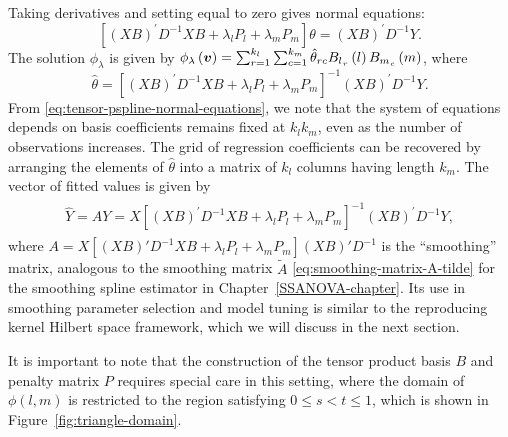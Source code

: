 \noindent
Taking derivatives and setting equal to zero gives normal equations:
\begin{equation} \label{eq:tensor-pspline-normal-equations}
\left[ \left(XB\right)^\prime D^{-1} XB +  \lambda_l P_l+ \lambda_m P_m\right]\theta = \left(X B\right)^\prime D^{-1}Y.
\end{equation}
\noindent
The solution $\phi_\lambda$ is given by $\phi_\lambda\left(\mbox{\boldmath $v$}\right) = \sum_{r=1}^{k_l} \sum_{c=1}^{k_m} \hat{\theta}_{rc} {B_l}_{_{r}}\left(l\right){B_m}_{_{c}}\left(m\right)$, where
\begin{equation} 
\hat{\theta} = \left[ \left(XB\right)^\prime D^{-1} XB +  \lambda_l P_l+ \lambda_m P_m\right]^{-1} \left(X B\right)^\prime D^{-1}Y.
\end{equation}
\noindent
From \eqref{eq:tensor-pspline-normal-equations}, we note that the system of equations depends on basis coefficients remains fixed at $k_l k_m$, even as the number of observations increases. The grid of regression coefficients can be recovered by arranging the elements of $\hat{\theta}$ into a matrix of $k_l$ columns having length $k_m$. The vector of fitted values is given by 
\begin{align}
\begin{split} \label{eq:pspline-smoothing-matrix}
\hat{Y} = AY  = X \left[ \left(XB\right)^\prime D^{-1} XB +  \lambda_l P_l+ \lambda_m P_m\right]^{-1} \left(X B\right)^\prime D^{-1}Y,
\end{split}
\end{align}
\noindent
where $A = X \left[ \left(XB\right)' D^{-1} XB +  \lambda_l P_l+ \lambda_m P_m\right] \left(X B\right)' D^{-1}$ is the ``smoothing'' matrix, analogous to the smoothing matrix $\tilde{A}$ \eqref{eq:smoothing-matrix-A-tilde} for the smoothing spline estimator in Chapter~\ref{SSANOVA-chapter}. Its use in smoothing parameter selection and model tuning is similar to the reproducing kernel Hilbert space framework, which we will discuss in the next section.

\bigskip

It is important to note that the construction of the tensor product basis $B$ and penalty matrix $P$ requires special care in this setting, where the domain of ${\phi}\left(l,m\right)$ is restricted to the region satisfying $0 \le s < t \le 1$, which is shown in Figure~\ref{fig:triangle-domain}.

